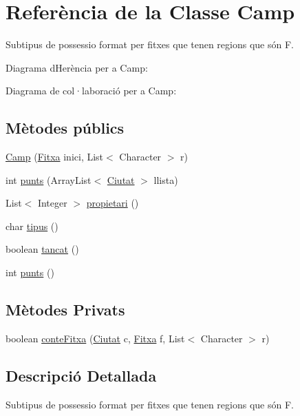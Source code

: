 \hypertarget{class_camp}{}\section{Referència de la Classe Camp}
\label{class_camp}


Subtipus de possessio format per fitxes que tenen regions que són F.  




Diagrama d\textquotesingle{}Herència per a Camp\+:


Diagrama de col·laboració per a Camp\+:
\subsection*{Mètodes públics}
\begin{DoxyCompactItemize}
\item 
\mbox{\hyperlink{class_camp_a9d376bd3292221a79dd845139e1f0546}{Camp}} (\mbox{\hyperlink{class_fitxa}{Fitxa}} inici, List$<$ Character $>$ r)
\item 
int \mbox{\hyperlink{class_camp_aa62c5e5ffa6084bb8363c5efba469068}{punts}} (Array\+List$<$ \mbox{\hyperlink{class_ciutat}{Ciutat}} $>$ llista)
\item 
List$<$ Integer $>$ \mbox{\hyperlink{class_camp_a24ebece7eea1aa266390b8762c0a1aa5}{propietari}} ()
\item 
char \mbox{\hyperlink{class_camp_aff9badaa78f13e44821cf267de34f03f}{tipus}} ()
\item 
boolean \mbox{\hyperlink{class_camp_a8a3acd8770255a775e505ce1bcb64856}{tancat}} ()
\item 
int \mbox{\hyperlink{class_camp_a22023a3a842b831b8b44db10a69afbd7}{punts}} ()
\end{DoxyCompactItemize}
\subsection*{Mètodes Privats}
\begin{DoxyCompactItemize}
\item 
boolean \mbox{\hyperlink{class_camp_a2bd097873f0c20f7e1ca04cb455ca114}{conte\+Fitxa}} (\mbox{\hyperlink{class_ciutat}{Ciutat}} c, \mbox{\hyperlink{class_fitxa}{Fitxa}} f, List$<$ Character $>$ r)
\end{DoxyCompactItemize}


\subsection{Descripció Detallada}
Subtipus de possessio format per fitxes que tenen regions que són F. 


